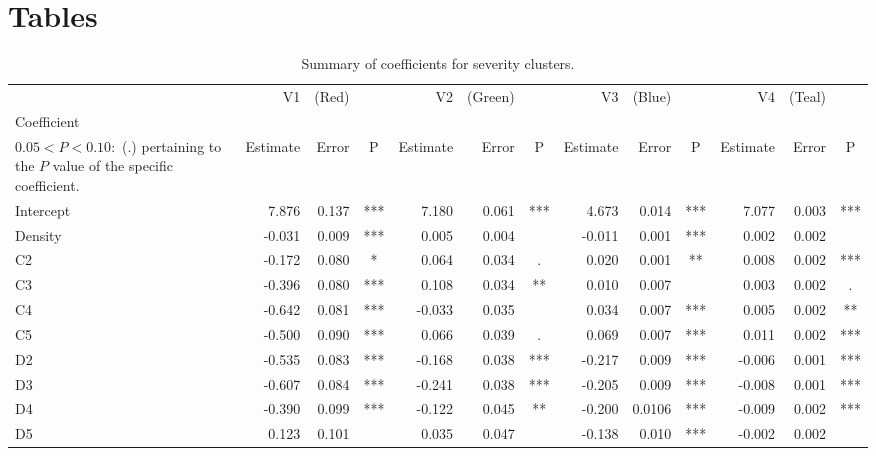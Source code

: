 \documentclass[11pt,letterpaper]{article}
\numberwithin{equation}{section}
\numberwithin{equation}{section}
\numberwithin{equation}{section}
\begin{document}
\section{Tables}\label{app:tables}

\begin{center}
\begin{table}
\caption{ Summary of coefficients for severity clusters.}
\label{severity_coef_table}
\begin{tabular}{|l|rrc|rrc|rrc|rrc|}
\hline\hline
         & V1         & (Red)     &    & V2         & (Green)   &    & V3          & (Blue)     &    & V4          & (Teal)     &    \\
Coefficient \footnote{The significance codes are defined as $  P < 0.001 : $  (***), $0.001 < P < 0.01:$ (**), $  0.01 < P < 0.05:$ (*),\\ $0.05 < P < 0.10 : $ (.) %
pertaining to the $P$ value of the specific coefficient.}      & Estimate   & Error     & P   & Estimate   & Error     & P   & Estimate    & Error      & P   & Estimate    & Error      & P   \\ \hline
Intercept & 7.876  & 0.137 & *** & 7.180  & 0.061 & *** & 4.673   & 0.014 & *** & 7.077  & 0.003 & *** \\
Density   & -0.031 & 0.009 & *** & 0.005  & 0.004 &     & -0.011 & 0.001 & *** & 0.002  & 0.002 &     \\
C2        & -0.172 & 0.080 & *   & 0.064  & 0.034 & .   & 0.020 & 0.001 & **  & 0.008  & 0.002 & *** \\
C3        & -0.396 & 0.080 & *** & 0.108  & 0.034 & **  & 0.010  & 0.007 &     & 0.003  & 0.002 & .   \\
C4        & -0.642 & 0.081 & *** & -0.033 & 0.035 &     & 0.034  & 0.007 & *** & 0.005  & 0.002 & **  \\
C5        & -0.500 & 0.090 & *** & 0.066 & 0.039 & .   & 0.069  & 0.007 & *** & 0.011  & 0.002 & *** \\
D2        & -0.535 & 0.083 & *** & -0.168 & 0.038 & *** & -0.217 & 0.009 & *** & -0.006 & 0.001 & *** \\
D3        & -0.607  & 0.084 & *** & -0.241 & 0.038 & *** & -0.205 & 0.009 & *** & -0.008 & 0.001 & *** \\
D4        & -0.390 & 0.099 & *** & -0.122 & 0.045 & **  & -0.200 & 0.0106 & *** & -0.009  & 0.002 & *** \\
D5        & 0.123 & 0.101 &     & 0.035  & 0.047 &     & -0.138 & 0.010 & *** & -0.002 & 0.002 &     \\

\end{tabular}
\end{table}
\end{center}
\end{document}
